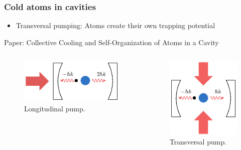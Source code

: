 \documentclass[pdflatex,compress]{beamer}
\begin{document}
\begin{frame}
\frametitle{Cold atoms in cavities}
\begin{itemize}
	\item Transversal pumping: Atoms create their own trapping potential
\end{itemize}
Paper: Collective Cooling and Self-Organization of Atoms in a Cavity \cite{domokos2002}
\vspace{-2em}
\begin{columns}
\begin{figure}
\centering
\includegraphics[width=1\textwidth]{images/pump_long.eps}
\caption{Longitudinal pump.}
\end{figure}
\begin{figure}
\centering
\includegraphics[width=1\textwidth]{images/pump_trans.eps}
\caption{Transversal pump.}
\end{figure}
\end{columns}
\end{frame}
\end{document}

